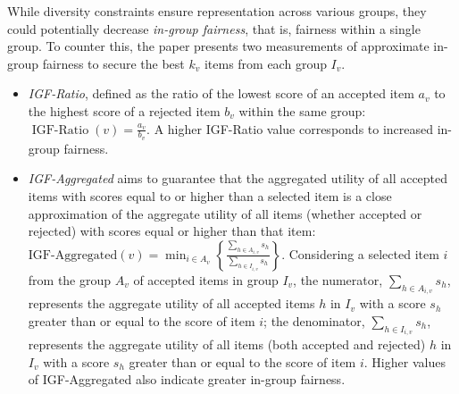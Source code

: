 
While diversity constraints ensure representation across various groups, they could potentially decrease \emph{in-group fairness}, that is, fairness within a single group. To counter this, the paper presents two measurements of approximate in-group fairness to secure the best $k_v$ items from each group $I_v$.

\begin{itemize}
    \item \emph{IGF-Ratio},
     defined as the ratio of the lowest score of an accepted item $a_v$ to the highest score of a rejected item $b_v$ within the same group: $\operatorname{IGF-Ratio}(v)=\frac{a_v}{b_v}$. A higher IGF-Ratio value corresponds to increased in-group fairness.


    \item \emph{IGF-Aggregated}
     aims to guarantee that the aggregated utility of all accepted items with scores equal to or higher than a selected item is a close approximation of the aggregate utility of all items (whether accepted or rejected) with scores equal or higher than that item: $        \text{IGF-Aggregated}(v)=\min _{i \in A_v}\left\{\frac{\sum_{h \in A_{i, v}} s_h}{\sum_{h \in I_{i, v}} s_h}\right\}
$.
    Considering a selected item $i$ from the group $A_v$ of accepted items in group $I_v$, the numerator, $\sum_{h \in A_{i, v}} s_h$, represents the aggregate utility of all accepted items $h$ in $I_v$ with a score $s_h$ greater than or equal to the score of item $i$; the denominator, $\sum_{h \in I_{i, v}} s_h$, represents the aggregate utility of all items (both accepted and rejected) $h$ in $I_v$ with a score $s_h$ greater than or equal to the score of item $i$.
Higher values of IGF-Aggregated also indicate greater in-group fairness.

\end{itemize}

